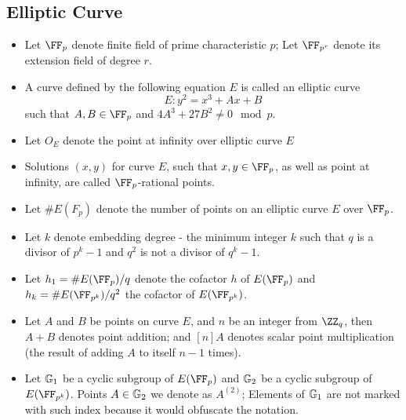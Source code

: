 \subsection*{Elliptic Curve}
\begin{itemize}[label=$\circ$]
    \item Let $\FF_p$ denote finite field of prime characteristic $p$; Let $\FF_{p^r}$ denote its extension field of degree $r$.
    \item A curve defined by the following equation $E$ is called an elliptic curve
    $$ E: y^2 = x^3 + Ax + B $$
    such that $A, B \in \FF_p$ and $4A^3 + 27B^2 \neq 0 \mod p$.
    \item Let $O_E$ denote the point at infinity over elliptic curve $E$
    \item Solutions $(x, y)$ for curve $E$, such that $x, y \in \FF_p$, as well as point at infinity, are called $\FF_p$-rational points. 
    \item Let $\#E(F_p)$ denote the number of points on an elliptic curve $E$ over $\FF_p$.
    \item Let $k$ denote embedding degree - the minimum integer $k$ such that $q$ is a divisor of $p^k - 1$ and $q^2$ is not a divisor of $q^k - 1$.
    \item Let $h_1 = \#E(\FF_p) / q$ denote the cofactor $h$ of $E(\FF_p)$ and $h_k = \#E(\FF_{p^k}) / q^2$ the cofactor of $E(\FF_{p^k})$.
    \item Let $A$ and $B$ be points on curve $E$, and $n$ be an integer from $\ZZ_q$, then $A + B$ denotes point addition; and $[n]A$ denotes scalar point multiplication (the result of adding $A$ to itself $n - 1$ times).
    \item Let $\mathbb{G}_1$ be a cyclic subgroup of $E(\FF_p)$ and $\mathbb{G}_2$ be a cyclic subgroup of $E(\FF_{p^k})$. Points $A \in \mathbb{G}_2$ we denote as $A^{(2)}$; Elements of $\mathbb{G}_1$ are not marked with such index because it would obfuscate the notation. 
\end{itemize}


